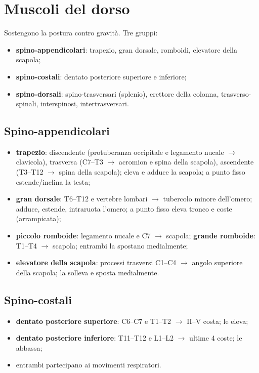 \section{Muscoli del dorso}

Sostengono la postura contro gravità. Tre gruppi:
\begin{itemize}
  \item \textbf{spino-appendicolari}: trapezio, gran dorsale, romboidi, elevatore della scapola;
  \item \textbf{spino-costali}: dentato posteriore superiore e inferiore;
  \item \textbf{spino-dorsali}: spino-trasversari (splenio), erettore della colonna,
    trasverso-spinali, interspinosi, intertrasversari.
\end{itemize}

\subsection{Spino-appendicolari}
\begin{itemize}
  \item \textbf{trapezio}: discendente (protuberanza occipitale e legamento nucale $\rightarrow$
    clavicola), trasversa (C7--T3 $\rightarrow$ acromion e spina della scapola), ascendente (T3--T12
    $\rightarrow$ spina della scapola); eleva e adduce la scapola; a punto fisso estende/inclina la
    testa;
  \item \textbf{gran dorsale}: T6--T12 e vertebre lombari $\rightarrow$ tubercolo minore dell'omero;
    adduce, estende, intraruota l'omero; a punto fisso eleva tronco e coste (arrampicata);
  \item \textbf{piccolo romboide}: legamento nucale e C7 $\rightarrow$ scapola; \textbf{grande
    romboide}: T1--T4 $\rightarrow$ scapola; entrambi la spostano medialmente;
  \item \textbf{elevatore della scapola}: processi trasversi C1--C4 $\rightarrow$ angolo superiore
    della scapola; la solleva e sposta medialmente.
\end{itemize}

\subsection{Spino-costali}
\begin{itemize}
  \item \textbf{dentato posteriore superiore}: C6--C7 e T1--T2 $\rightarrow$ II--V costa; le eleva;
  \item \textbf{dentato posteriore inferiore}: T11--T12 e L1--L2 $\rightarrow$ ultime 4 coste; le
    abbassa;
  \item entrambi partecipano ai movimenti respiratori.
\end{itemize}

